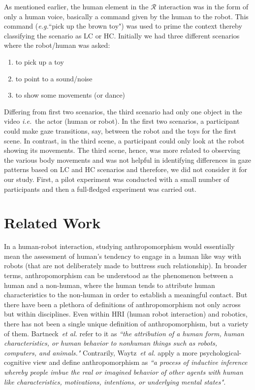 \documentclass{acm_proc_article-sp}
\newcommand{\eg}{{\textit{e.g.\xspace}}}
\newcommand{\etal}{{\textit{et al.\xspace}}}
\newcommand{\ie}{{\textit{i.e.\xspace}}}
\begin{document}
As mentioned earlier, the human element in the $\mathcal{R}$ interaction was in
the form of only a human voice, basically a command given by the human to the
robot. This command (\eg ``pick up the brown toy") was used to prime
the context thereby classifying the scenario as LC or HC. Initially we had three
different scenarios where the robot/human was asked:

\begin{enumerate}
    \item to pick up a toy
    \item to point to a sound/noise
    \item to show some movements (or dance)
\end{enumerate}

Differing from first two scenarios, the third scenario had only one object in
the video \ie~the actor (human or robot). In the first two scenarios, a
participant could make gaze transitions, say, between the robot and the toys for
the first scene. In contrast, in the third scene, a participant could only look
at the robot showing its movements. The third scene, hence, was more related to
observing the various body movements and was not helpful in identifying
differences in gaze patterns based on LC and HC scenarios and therefore, we did
not consider it for our study. First, a pilot experiment was conducted with a
small number of participants and then a full-fledged experiment was carried out.

\section{Related Work}

In a human-robot interaction, studying anthropomorphism would essentially mean
the assessment of human's tendency to engage in a human like way with robots
(that are not deliberately made to buttress such relationship). In broader
terms, anthropomorphism can be understood as the phenomenon between a human and
a non-human, where the human tends to attribute human characteristics to the
non-human in order to establish a meaningful contact\cite{fink2014dynamics}. But
there have been a plethora of definitions of anthropomorphism not only across
but within disciplines\cite{duffy_anthropomorphism_2002}. Even
within HRI (human robot interaction) and robotics, there has not been a single
unique definition of anthropomorphism, but a variety of them.
Bartneck~\etal\cite{bartneck_measurement_2008} refer to it as \emph{``the
attribution of a human form, human characteristics, or human behavior to
nonhuman things such as robots, computers, and animals."} Contrarily,
Waytz~\etal\cite{Waytz2010} apply a more psychological-cognitive view and
define anthropomorphism as \textit{``a process of inductive inference whereby
    people imbue the real or imagined behavior of other agents with human like
    characteristics, motivations, intentions, or underlying mental states".} 
\end{document}
